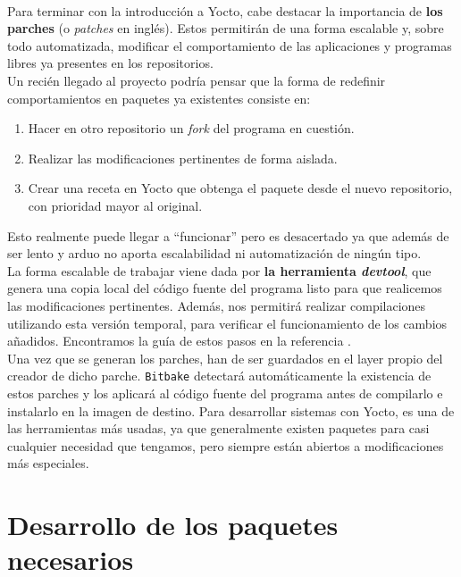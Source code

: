 \noindent\makebox[\linewidth]{\rule{\textwidth}{0.4pt}}\\

Para terminar con la introducción a Yocto, cabe destacar la importancia de \textbf{los parches} (o \textit{patches} en inglés). Estos permitirán de una forma escalable y, sobre todo automatizada, modificar el comportamiento de las aplicaciones y programas libres ya presentes en los repositorios.\\

Un recién llegado al proyecto podría pensar que la forma de redefinir comportamientos en paquetes ya existentes consiste en:

\begin{enumerate}
	\item Hacer en otro repositorio un \textit{fork} del programa en cuestión.
	\item Realizar las modificaciones pertinentes de forma aislada.
	\item Crear una receta en Yocto que obtenga el paquete desde el nuevo repositorio, con prioridad mayor al original.
\end{enumerate}

Esto realmente puede llegar a ``funcionar'' pero es desacertado ya que además de ser lento y arduo no aporta escalabilidad ni automatización de ningún tipo.\\

La forma escalable de trabajar viene dada por \textbf{la herramienta \textit{devtool}}, que genera una copia local del código fuente del programa listo para que realicemos las modificaciones pertinentes. Además, nos permitirá realizar compilaciones utilizando esta versión temporal, para verificar el funcionamiento de los cambios añadidos. Encontramos la guía de estos pasos en la referencia \cite{wiki-yocto-patches}.\\

Una vez que se generan los parches, han de ser guardados en el layer propio del creador de dicho parche. \texttt{Bitbake} detectará automáticamente la existencia de estos parches y los aplicará al código fuente del programa antes de compilarlo e instalarlo en la imagen de destino. Para desarrollar sistemas con Yocto, es una de las herramientas más usadas, ya que generalmente existen paquetes para casi cualquier necesidad que tengamos, pero siempre están abiertos a modificaciones más especiales.

\section{Desarrollo de los paquetes necesarios}

